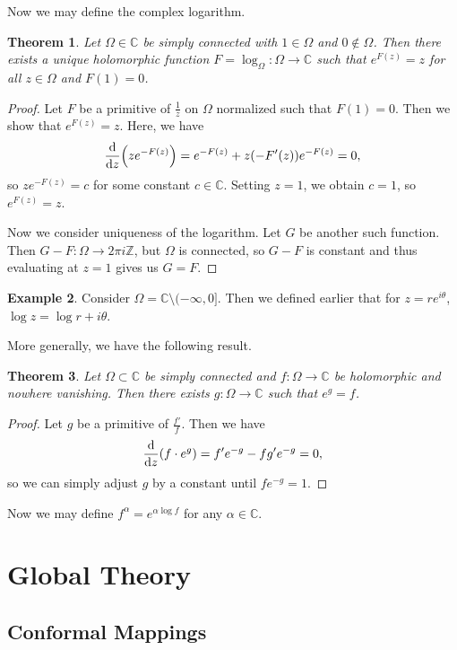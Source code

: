 \documentclass[leqno, openany]{memoir}
\newtheorem{thm}{Theorem}[section]
\theoremstyle{definition}
\newtheorem{exm}[thm]{Example}
\theoremstyle{remark}
\theoremstyle{plain}
\theoremstyle{definition}
\theoremstyle{remark}
\newcommand{\C}{\mathbb{C}}
\newcommand{\Z}{\mathbb{Z}}
\begin{document}
Now we may define the complex logarithm.

\begin{thm} Let $\Omega \in \C$ be simply connected with $1 \in \Omega$ and $0
    \notin \Omega$. Then there exists a unique holomorphic function $F =
    \log_{\Omega} \colon \Omega \to \C$ such that $e^{F(z)} = z$ for all $z \in
    \Omega$ and $F(1) = 0$.  \end{thm}

\begin{proof} Let $F$ be a primitive of $\frac{1}{z}$ on $\Omega$ normalized
    such that $F(1) = 0$. Then we show that $e^{F(z)} = z$. Here, we have \[
    \dv{z}(ze^{-F(z)}) = e^{-F(z)} + z(-F'(z)) e^{-F(z)} = 0, \] so $ze^{-F(z)}
    = c$ for some constant $c \in \C$. Setting $z = 1$, we obtain $c = 1$, so
    $e^{F(z)} = z$.

    Now we consider uniqueness of the logarithm. Let $G$ be another such
function. Then $G - F \colon \Omega \to 2 \pi i \Z$, but $\Omega$ is connected,
so $G-F$ is constant and thus evaluating at $z = 1$ gives us $G = F$.
\end{proof}

\begin{exm} Consider $\Omega = \C \setminus (-\infty, 0]$. Then we defined
earlier that for $z = re^{i\theta}$, $\log z = \log r + i \theta$.  \end{exm}

More generally, we have the following result.  \begin{thm} Let $\Omega \subset
\C$ be simply connected and $f \colon \Omega \to \C$ be holomorphic and nowhere
vanishing. Then there exists $g \colon \Omega \to \C$ such that $e^g = f$.
\end{thm}

\begin{proof} Let $g$ be a primitive of $\frac{f'}{f}$. Then we have \[ \dv{z}
(f \cdot e^g) = f' e^{-g} - f g' e^{-g} = 0, \] so we can simply adjust $g$ by
a constant until $fe^{-g} = 1$.  \end{proof}

Now we may define $f^{\alpha} = e^{\alpha \log f}$ for any $\alpha \in \C$.

\chapter{Global Theory}%

\section{Conformal Mappings}%
\end{document}
